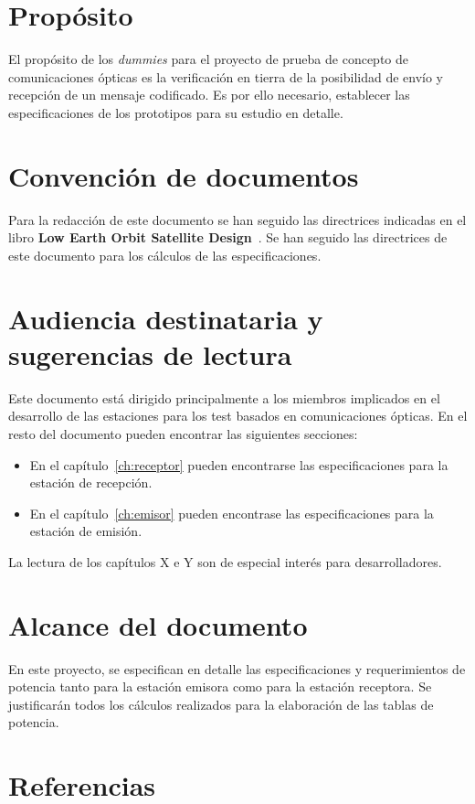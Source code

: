 \documentclass{scrreprt}
\begin{document}
\section{Propósito}

El propósito de los \textit{dummies} para el proyecto de prueba de concepto de comunicaciones ópticas es la verificación en tierra de la posibilidad de envío y recepción de un mensaje codificado. Es por ello necesario, establecer las especificaciones de los prototipos para su estudio en detalle.

\section{Convención de documentos}
Para la redacción de este documento se han seguido las directrices indicadas en el libro \textbf{Low Earth Orbit Satellite Design}~\cite{sebestyenlow2018}. Se han seguido las directrices de este documento para los cálculos de las especificaciones.

\section{Audiencia destinataria y sugerencias de lectura}
Este documento está dirigido principalmente a los miembros implicados en el desarrollo de las estaciones para los test basados en comunicaciones ópticas. En el resto del documento pueden encontrar las siguientes secciones:
\begin{itemize}
 \item En el capítulo~\ref{ch:receptor} pueden encontrarse las especificaciones para la estación de recepción.
 \item En el capítulo~\ref{ch:emisor} pueden encontrase las especificaciones para la estación de emisión.
\end{itemize}

La lectura de los capítulos X e Y son de especial interés para desarrolladores.

\section{Alcance del documento}
En este proyecto, se especifican en detalle las especificaciones y requerimientos de potencia tanto para la estación emisora como para la estación receptora. Se justificarán todos los cálculos realizados para la elaboración de las tablas de potencia.

\section{Referencias}
\end{document}
